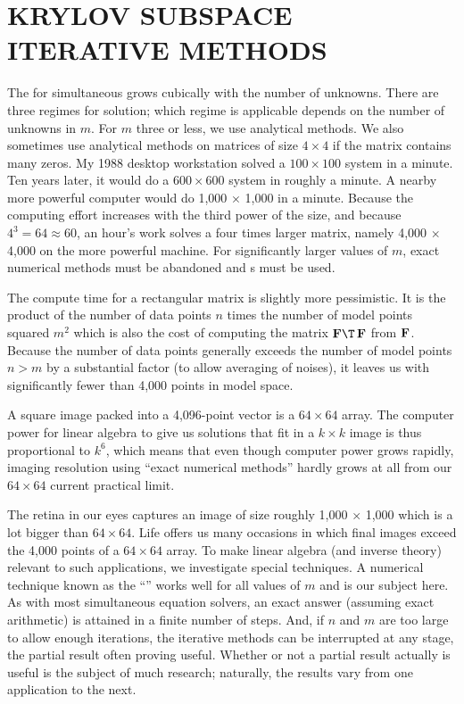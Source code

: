 

\section{KRYLOV SUBSPACE ITERATIVE METHODS}
The  for simultaneous 
grows cubically with the number of unknowns.
There are three regimes for solution;
which regime is applicable
depends on the number of unknowns in $m$.
For $m$ three or less, we use analytical methods.
We also sometimes use analytical methods on matrices of size $4\times 4$
if the matrix contains many zeros.
My 1988 desktop workstation solved a $100 \times 100$
system in a minute.
Ten years later, it would do a $600\times 600$ system in roughly a minute.
A nearby more powerful computer would do
1,000 $\times$ 1,000 in a minute.
Because the computing effort increases with the third power of the size,
and because $4^3=64\approx 60$,
an hour's work solves a four times larger matrix,
namely 4,000 $\times$ 4,000 on the more powerful machine.
For significantly larger values of $m$,
exact numerical methods must be abandoned
and s must be used.
\par
The compute time for a rectangular matrix is slightly more pessimistic.
It is the product of the number of data points $n$
times the number of model points squared $m^2$ which is also the cost of computing the matrix
$\bold F\T\,\bold F$ from $\bold F$.
Because the number of data points generally exceeds the number of model
points $n>m$ by a substantial factor
(to allow averaging of noises),
it leaves us with significantly fewer than 4,000 points in model space.
\par
A square image packed into a 4,096-point vector is a $64\times 64$ array.
The computer power for linear algebra to give us solutions that
fit in a $k\times k$ image is thus proportional
to $k^6$, which means that even though computer power grows rapidly,
imaging resolution using ``exact numerical methods'' hardly
grows at all from our $64\times 64$ current practical limit.

\par
The retina in our eyes captures an image of size roughly 1,000 $\times$ 1,000
which is a lot bigger than $64\times 64$.
Life offers us many occasions in which final images exceed the 4,000
points of a $64\times 64$ array.
To make linear algebra (and inverse theory) relevant to such applications,
we investigate special techniques.
A numerical technique known as the
``''
works well for all values of $m$ and is our subject here.
As with most simultaneous equation solvers,
an exact answer (assuming exact arithmetic)
is attained in a finite number of steps.
And, if $n$ and $m$ are too large to allow enough iterations,
the iterative methods can be interrupted at any stage,
the partial result often proving useful.
Whether or not a partial result actually is useful
is the subject of much research;
naturally, the results vary from one application to the next.

